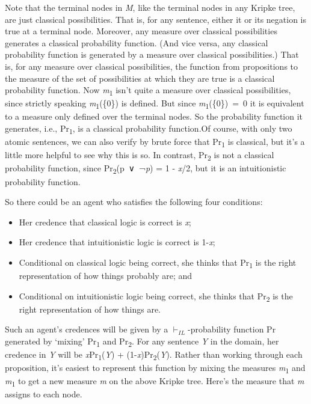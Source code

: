 \documentclass[
  10pt,
  letterpaper,
  DIV=11,
  numbers=noendperiod,
  twoside]{scrartcl}
\providecommand{\tightlist}{%
  \setlength{\itemsep}{0pt}\setlength{\parskip}{0pt}}\usepackage{longtable,booktabs,array}
\begin{document}
Note that the terminal nodes in \emph{M}, like the terminal nodes in any
Kripke tree, are just classical possibilities. That is, for any
sentence, either it or its negation is true at a terminal node.
Moreover, any measure over classical possibilities generates a classical
probability function. (And vice versa, any classical probability
function is generated by a measure over classical possibilities.) That
is, for any measure over classical possibilities, the function from
propositions to the measure of the set of possibilities at which they
are true is a classical probability function. Now
\emph{m}\textsubscript{1} isn't quite a measure over classical
possibilities, since strictly speaking \emph{m}\textsubscript{1}(\{0\})
is defined. But since \emph{m}\textsubscript{1}(\{0\})~=~0 it is
equivalent to a measure only defined over the terminal nodes. So the
probability function it generates, i.e., Pr\textsubscript{1}, is a
classical probability function.Of course, with only two atomic
sentences, we can also verify by brute force that Pr\textsubscript{1} is
classical, but it's a little more helpful to see why this is so. In
contrast, Pr\textsubscript{2} is not a classical probability function,
since Pr\textsubscript{2}(p~∨~¬\emph{p}) = 1 - \emph{x}/2, but it is an
intuitionistic probability function.

So there could be an agent who satisfies the following four conditions:

\begin{itemize}
\tightlist
\item
  Her credence that classical logic is correct is \emph{x};
\item
  Her credence that intuitionistic logic is correct is 1-\emph{x};
\item
  Conditional on classical logic being correct, she thinks that
  Pr\textsubscript{1} is the right representation of how things probably
  are; and
\item
  Conditional on intuitionistic logic being correct, she thinks that
  Pr\textsubscript{2} is the right representation of how things are.
\end{itemize}

Such an agent's credences will be given by a \(\vdash_{IL}\)-probability
function Pr generated by `mixing' Pr\textsubscript{1} and
Pr\textsubscript{2}. For any sentence \emph{Y} in the domain, her
credence in \emph{Y} will be \emph{x}Pr\textsubscript{1}(\emph{Y}) +
(1-\emph{x})Pr\textsubscript{2}(\emph{Y}). Rather than working through
each proposition, it's easiest to represent this function by mixing the
measures \emph{m}\textsubscript{1} and \emph{m}\textsubscript{1} to get
a new measure \emph{m} on the above Kripke tree. Here's the measure that
\emph{m} assigns to each node.
\end{document}
